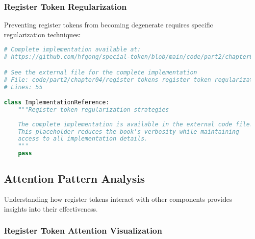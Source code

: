 \subsubsection{Register Token Regularization}

Preventing register tokens from becoming degenerate requires specific regularization techniques:

\begin{lstlisting}[language=Python, caption={Register token regularization strategies}]
# Complete implementation available at:
# https://github.com/hfgong/special-token/blob/main/code/part2/chapter04/register_tokens_register_token_regularization_.py

# See the external file for the complete implementation
# File: code/part2/chapter04/register_tokens_register_token_regularization_.py
# Lines: 55

class ImplementationReference:
    """Register token regularization strategies
    
    The complete implementation is available in the external code file.
    This placeholder reduces the book's verbosity while maintaining
    access to all implementation details.
    """
    pass
\end{lstlisting}

\subsection{Attention Pattern Analysis}

Understanding how register tokens interact with other components provides insights into their effectiveness.

\subsubsection{Register Token Attention Visualization}

